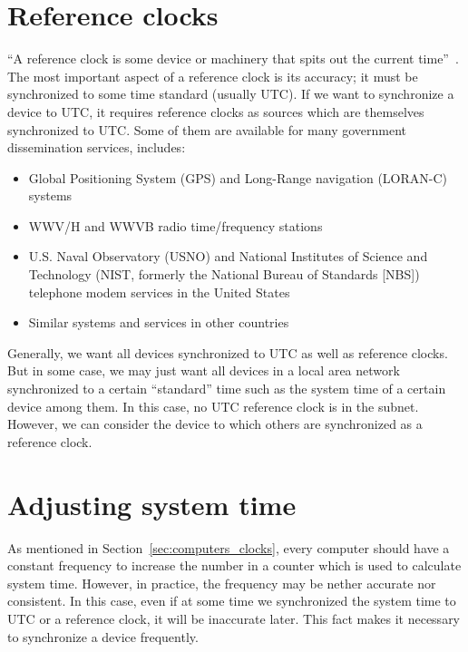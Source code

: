 \section{Reference clocks}%
\label{sec:reference_clocks}
``A reference clock is some device or machinery that spits out the current
time''~\cite{reference_clock}.
The most important aspect of a reference clock is its accuracy; it must be
synchronized to some time standard (usually UTC). If we want to synchronize a
device to UTC, it requires reference clocks as sources which are themselves
synchronized to UTC\null. Some of them are
available for many government dissemination services, includes:~\cite{redbook}
\begin{itemize}
    \item Global Positioning System (GPS) and Long-Range navigation (LORAN-C)
        systems
    \item WWV/H and WWVB radio time/frequency stations
    \item U.S. Naval Observatory (USNO) and National Institutes of Science and
        Technology (NIST\null, formerly the National Bureau of Standards [NBS])
        telephone modem services in the United States
    \item Similar systems and services in other countries
\end{itemize}
Generally, we want all devices synchronized to UTC as well as reference clocks.
But in some case, we may just want all devices in a local area network
synchronized to a certain ``standard'' time such as the system time of a
certain device among them. In this case, no UTC reference clock is in the
subnet. However, we can consider the device to which others are synchronized as
a reference clock. 

\section{Adjusting system time}%
\label{sec:adjusting_system_time}
As mentioned in Section~\ref{sec:computers_clocks}, every computer should have
a constant frequency to increase the number in a counter which is used to
calculate system time. However, in practice, the frequency may be nether
accurate nor consistent. In this case, even if at some time we synchronized the
system time to UTC or a reference clock, it will be inaccurate later. This fact
makes it necessary to synchronize a device frequently.

